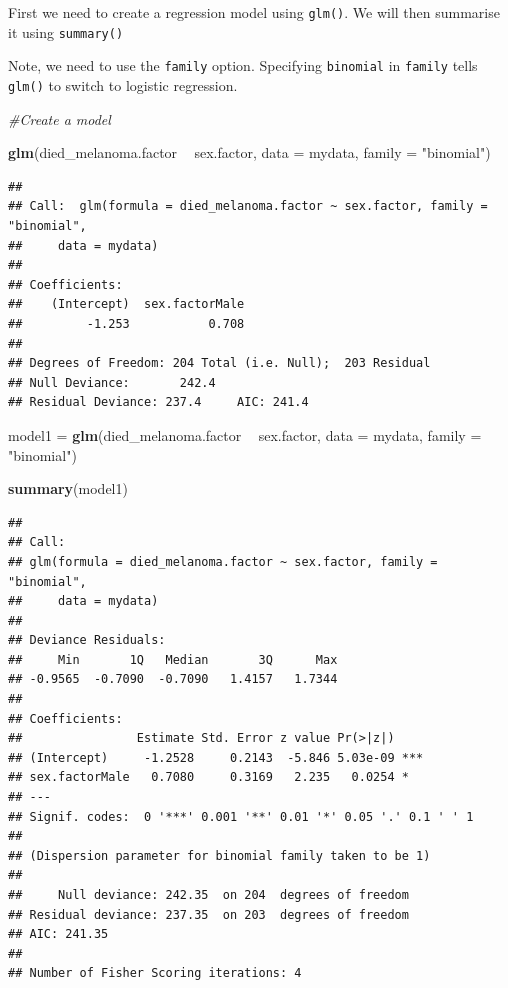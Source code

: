 \documentclass[12pt,]{krantz}
\makeatletter
\newenvironment{Shaded}{\begin{snugshade}}{\end{snugshade}}
\newcommand{\CommentTok}[1]{\textcolor[rgb]{0.56,0.35,0.01}{\textit{#1}}}
\newcommand{\DataTypeTok}[1]{\textcolor[rgb]{0.13,0.29,0.53}{#1}}
\newcommand{\KeywordTok}[1]{\textcolor[rgb]{0.13,0.29,0.53}{\textbf{#1}}}
\newcommand{\NormalTok}[1]{#1}
\newcommand{\OperatorTok}[1]{\textcolor[rgb]{0.81,0.36,0.00}{\textbf{#1}}}
\newcommand{\StringTok}[1]{\textcolor[rgb]{0.31,0.60,0.02}{#1}}
\newenvironment{kframe}{%
\medskip{}
\setlength{\fboxsep}{.8em}
 \def\at@end@of@kframe{}%
 \ifinner\ifhmode%
  \def\at@end@of@kframe{\end{minipage}}%
  \begin{minipage}{\columnwidth}%
 \fi\fi%
 \def\FrameCommand##1{\hskip\@totalleftmargin \hskip-\fboxsep
 \colorbox{shadecolor}{##1}\hskip-\fboxsep
     \hskip-\linewidth \hskip-\@totalleftmargin \hskip\columnwidth}%
 \MakeFramed {\advance\hsize-\width
   \@totalleftmargin\z@ \linewidth\hsize
   \@setminipage}}%
 {\par\unskip\endMakeFramed%
 \at@end@of@kframe}
\renewenvironment{Shaded}{\begin{kframe}}{\end{kframe}}
\theoremstyle{definition}
\theoremstyle{definition}
\theoremstyle{definition}
\theoremstyle{remark}
\makeatother
\begin{document}
First we need to create a regression model using \texttt{glm()}. We will
then summarise it using \texttt{summary()}

Note, we need to use the \texttt{family} option. Specifying
\texttt{\textquotesingle{}binomial\textquotesingle{}} in \texttt{family}
tells \texttt{glm()} to switch to logistic regression.

\begin{Shaded}
\begin{Highlighting}[]
\CommentTok{#Create a model}

\KeywordTok{glm}\NormalTok{(died_melanoma.factor }\OperatorTok{~}\StringTok{ }\NormalTok{sex.factor, }\DataTypeTok{data =}\NormalTok{ mydata, }\DataTypeTok{family =} \StringTok{"binomial"}\NormalTok{)}
\end{Highlighting}
\end{Shaded}

\begin{verbatim}
## 
## Call:  glm(formula = died_melanoma.factor ~ sex.factor, family = "binomial", 
##     data = mydata)
## 
## Coefficients:
##    (Intercept)  sex.factorMale  
##         -1.253           0.708  
## 
## Degrees of Freedom: 204 Total (i.e. Null);  203 Residual
## Null Deviance:       242.4 
## Residual Deviance: 237.4     AIC: 241.4
\end{verbatim}

\begin{Shaded}
\begin{Highlighting}[]
\NormalTok{model1 =}\StringTok{ }\KeywordTok{glm}\NormalTok{(died_melanoma.factor }\OperatorTok{~}\StringTok{ }\NormalTok{sex.factor, }\DataTypeTok{data =}\NormalTok{ mydata, }\DataTypeTok{family =} \StringTok{"binomial"}\NormalTok{)}

\KeywordTok{summary}\NormalTok{(model1)}
\end{Highlighting}
\end{Shaded}

\begin{verbatim}
## 
## Call:
## glm(formula = died_melanoma.factor ~ sex.factor, family = "binomial", 
##     data = mydata)
## 
## Deviance Residuals: 
##     Min       1Q   Median       3Q      Max  
## -0.9565  -0.7090  -0.7090   1.4157   1.7344  
## 
## Coefficients:
##                Estimate Std. Error z value Pr(>|z|)    
## (Intercept)     -1.2528     0.2143  -5.846 5.03e-09 ***
## sex.factorMale   0.7080     0.3169   2.235   0.0254 *  
## ---
## Signif. codes:  0 '***' 0.001 '**' 0.01 '*' 0.05 '.' 0.1 ' ' 1
## 
## (Dispersion parameter for binomial family taken to be 1)
## 
##     Null deviance: 242.35  on 204  degrees of freedom
## Residual deviance: 237.35  on 203  degrees of freedom
## AIC: 241.35
## 
## Number of Fisher Scoring iterations: 4
\end{verbatim}
\end{document}
